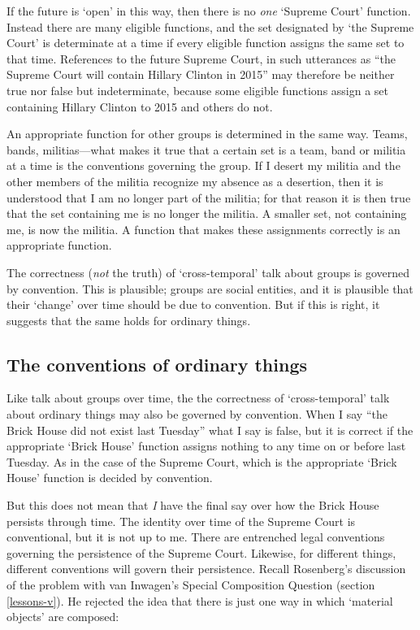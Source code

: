 \documentclass[11pt]{article}
\begin{document}
\begin{spacing}{1.5}
If the future is `open' in this way, then there is no {\em one}
`Supreme Court' function.  Instead there are many eligible functions,
and the set designated by `the Supreme Court' is determinate at a time
if every eligible function assigns the same set to that time.
References to the future Supreme Court, in such utterances as ``the
Supreme Court will contain Hillary Clinton in 2015'' may therefore be
neither true nor false but indeterminate, because some eligible
functions assign a set containing Hillary Clinton to 2015 and others
do not.


An appropriate function for other groups is determined in the same
way.  Teams, bands, militias---what makes it true that a certain set
is a team, band or militia at a time is the conventions governing the
group.  If I desert my militia and the other members of the militia
recognize my absence as a desertion, then it is understood that I am
no longer part of the militia; for that reason it is then true that
the set containing me is no longer the militia.  A smaller set, not
containing me, is now the militia.  A function that makes these
assignments correctly is an appropriate function.

The correctness ({\em not} the truth) of `cross-temporal' talk about
groups is governed by convention.  This is plausible; groups are
social entities, and it is plausible that their `change' over time
should be due to convention.  But if this is right, it suggests that
the same holds for ordinary things.

\subsection{The conventions of ordinary things}
\label{chair-ref}
Like talk about groups over time, the the correctness of
`cross-temporal' talk about ordinary things may also be governed by
convention.  When I say ``the Brick House did not exist last Tuesday''
what I say is false, but it is correct if the appropriate `Brick
House' function assigns nothing to any time on or before last Tuesday.
As in the case of the Supreme Court, which is the appropriate `Brick
House' function is decided by convention.

But this does not mean that {\em I} have the final say over how the
Brick House persists through time.  The identity over time of the
Supreme Court is conventional, but it is not up to me.  There are
entrenched legal conventions governing the persistence of the Supreme
Court.  Likewise, for different things, different conventions will
govern their persistence.  Recall Rosenberg's discussion of the
problem with van Inwagen's Special Composition Question (section
\ref{lessons-v}).  He rejected the idea that there is just one way in
which `material objects' are composed:


\end{spacing}
\end{document}
